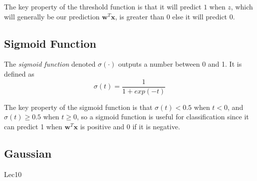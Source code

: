 \documentclass[12pt]{article}
\begin{document}

        The key property of the threshold function is that it will predict $1$ when $z$, which will generally be our
        prediction $\boldsymbol{w}^T\boldsymbol{x}$, is greater than $0$ else it will predict $0$.

    \subsection{Sigmoid Function} \label{sec:Sigmoid}
        The \textit{sigmoid function} denoted $\sigma(\cdot)$ outputs a number between 0 and 1. It is defined as
        $$ \sigma(t) = \frac{1}{1 + exp(-t)} $$


        The key property of the sigmoid function is that $\sigma(t) < 0.5$ when $t < 0$, and $\sigma(t) \geq 0.5$ when
        $t \geq 0$, so a sigmoid function is useful for classification since it can predict 1 when
        $\boldsymbol{w}^T\boldsymbol{x}$ is positive and 0 if it is negative.

    \subsection{Gaussian} Lec10
\end{document}
